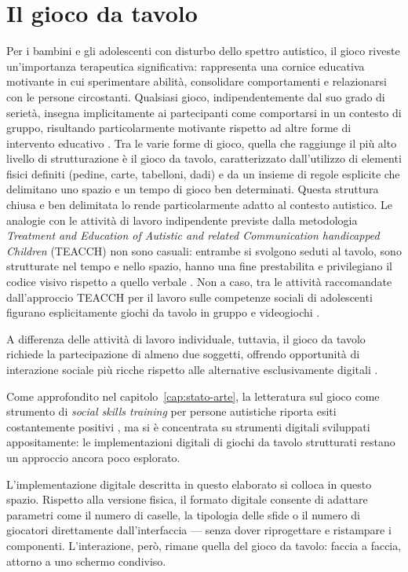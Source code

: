 \documentclass[12pt]{report}
\begin{document}
\section{Il gioco da tavolo}

Per i bambini e gli adolescenti con disturbo dello spettro autistico, il gioco riveste un'importanza terapeutica significativa: rappresenta una cornice educativa motivante in cui sperimentare abilità, consolidare comportamenti e relazionarsi con le persone circostanti.
Qualsiasi gioco, indipendentemente dal suo grado di serietà, insegna implicitamente ai partecipanti come comportarsi in un contesto di gruppo, risultando particolarmente motivante rispetto ad altre forme di intervento educativo \cite{atherton2021}.
Tra le varie forme di gioco, quella che raggiunge il più alto livello di strutturazione è il gioco da tavolo, caratterizzato dall'utilizzo di elementi fisici definiti (pedine, carte, tabelloni, dadi) e da un insieme di regole esplicite che delimitano uno spazio e un tempo di gioco ben determinati.
Questa struttura chiusa e ben delimitata lo rende particolarmente adatto al contesto autistico. Le analogie con le attività di lavoro indipendente previste dalla metodologia \textit{Treatment and Education of Autistic and related Communication handicapped Children} (TEACCH) non sono casuali: entrambe si svolgono seduti al tavolo, sono strutturate nel tempo e nello spazio, hanno una fine prestabilita e privilegiano il codice visivo rispetto a quello verbale \cite{mari2018, mesibov2005}. Non a caso, tra le attività raccomandate dall'approccio TEACCH per il lavoro sulle competenze sociali di adolescenti figurano esplicitamente giochi da tavolo in gruppo e videogiochi \cite{mesibov2005}.

A differenza delle attività di lavoro individuale, tuttavia, il gioco da tavolo richiede la partecipazione di almeno due soggetti, offrendo opportunità di interazione sociale più ricche rispetto alle alternative esclusivamente digitali \cite{atherton2021}.

Come approfondito nel capitolo~\ref{cap:stato-arte}, la letteratura sul gioco come strumento di \textit{social skills training} per persone autistiche riporta esiti costantemente positivi \cite{walsh2024}, ma si è concentrata su strumenti digitali sviluppati appositamente: le implementazioni digitali di giochi da tavolo strutturati restano un approccio ancora poco esplorato.

L'implementazione digitale descritta in questo elaborato si colloca in questo spazio. Rispetto alla versione fisica, il formato digitale consente di adattare parametri come il numero di caselle, la tipologia delle sfide o il numero di giocatori direttamente dall'interfaccia --- senza dover riprogettare e ristampare i componenti. L'interazione, però, rimane quella del gioco da tavolo: faccia a faccia, attorno a uno schermo condiviso.
\end{document}
